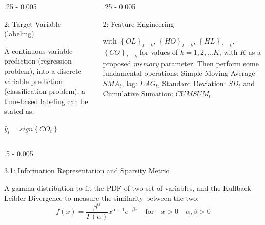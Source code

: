 \documentclass{postertheme}\usepackage[]{graphicx}\usepackage[]{color}
\begin{document}
\begin{frame}
\begin{columns}[onlytextwidth]
  \begin{column}{.25 \textwidth - 0.005 \textwidth}
    \begin{block}{2: Target Variable (labeling)} \footnotesize
    
    A continuous variable prediction (regression problem), into
    a discrete variable prediction (classification problem), a time-based labeling can be stated as:
      
      $\hat{y}_{t} = sign \left\{ CO_{t} \right\}$

    \end{block}
  \end{column}

  \begin{column}{.25 \textwidth - 0.005 \textwidth}
    \begin{block}{2: Feature Engineering} \footnotesize

     with $\left\{ OL \right\}_{t-k}$, $\left\{ HO \right\}_{t-k}$, $\left\{ HL \right\}_{t-k}$,
      $\left\{ CO \right\}_{t-k}$ for values of $k = 1, 2, ... K$, with $K$ as a proposed 
      \textit{memory} parameter. Then perform some fundamental operations: Simple Moving Average $SMA_{t}$,
      lag: $LAG_{t}$, Standard Deviation: $SD_t$ and Cumulative Sumation: $CUMSUM_{t}$.

    \end{block}
  \end{column}
  
\end{columns}


\begin{columns}[onlytextwidth]
  
  \begin{column}{.5 \textwidth - 0.005 \textwidth}
    \begin{block}{3.1: Information Representation and Sparsity Metric}
    
    \footnotesize
    A gamma distribution to fit the PDF of two set of variables, and the Kullback-Leibler Divergence to measure 
    the similarity between the two:
    \begin{equation}
      f(x) = \frac{\beta^{\alpha}}{\Gamma(\alpha)} x^{\alpha - 1}e^{-\beta x} \quad \text{for}
      \quad x > 0 \quad \alpha,\beta >0 
    \end{equation}
    

\end{block}
\end{column}
\end{columns}
\end{frame}
\end{document}
